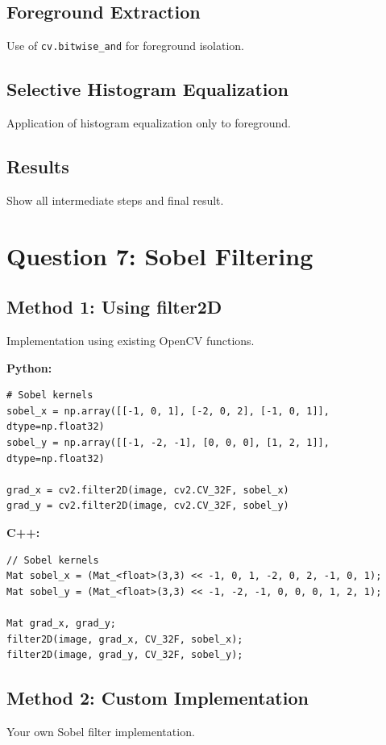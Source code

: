 \documentclass[12pt]{article}
\begin{document}
\subsection{Foreground Extraction}
Use of \texttt{cv.bitwise\_and} for foreground isolation.

\subsection{Selective Histogram Equalization}
Application of histogram equalization only to foreground.

\subsection{Results}
Show all intermediate steps and final result.

\section{Question 7: Sobel Filtering}
\subsection{Method 1: Using filter2D}
Implementation using existing OpenCV functions.

\textbf{Python:}
\begin{lstlisting}[style=pythonstyle]
# Sobel kernels
sobel_x = np.array([[-1, 0, 1], [-2, 0, 2], [-1, 0, 1]], dtype=np.float32)
sobel_y = np.array([[-1, -2, -1], [0, 0, 0], [1, 2, 1]], dtype=np.float32)

grad_x = cv2.filter2D(image, cv2.CV_32F, sobel_x)
grad_y = cv2.filter2D(image, cv2.CV_32F, sobel_y)
\end{lstlisting}

\textbf{C++:}
\begin{lstlisting}[style=cppstyle]
// Sobel kernels
Mat sobel_x = (Mat_<float>(3,3) << -1, 0, 1, -2, 0, 2, -1, 0, 1);
Mat sobel_y = (Mat_<float>(3,3) << -1, -2, -1, 0, 0, 0, 1, 2, 1);

Mat grad_x, grad_y;
filter2D(image, grad_x, CV_32F, sobel_x);
filter2D(image, grad_y, CV_32F, sobel_y);
\end{lstlisting}

\subsection{Method 2: Custom Implementation}
Your own Sobel filter implementation.
\end{document}
